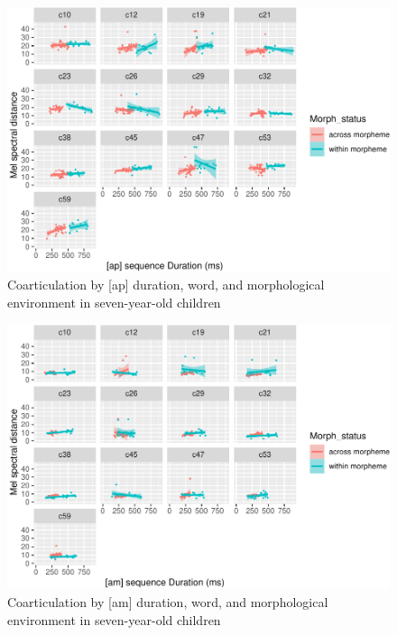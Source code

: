 \documentclass[
]{article}
\begin{document}
\begin{figure}
\centering
\includegraphics{3_ch3_results_files/figure-latex/seven-facet-ap-1.pdf}
\caption{\label{fig:seven-facet-ap}Coarticulation by {[}ap{]} duration, word, and morphological environment in seven-year-old children}
\end{figure}

\begin{figure}
\centering
\includegraphics{3_ch3_results_files/figure-latex/seven-facet-am-1.pdf}
\caption{\label{fig:seven-facet-am}Coarticulation by {[}am{]} duration, word, and morphological environment in seven-year-old children}
\end{figure}
\end{document}
